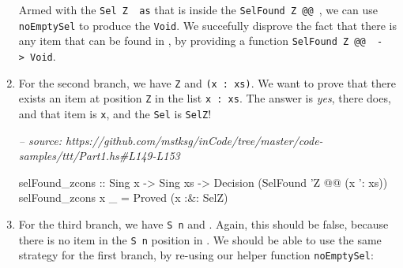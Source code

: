 \documentclass[]{article}
\newenvironment{Shaded}{}{}
\newcommand{\CommentTok}[1]{\textcolor[rgb]{0.38,0.63,0.69}{\textit{#1}}}
\newcommand{\DataTypeTok}[1]{\textcolor[rgb]{0.56,0.13,0.00}{#1}}
\newcommand{\FunctionTok}[1]{\textcolor[rgb]{0.02,0.16,0.49}{#1}}
\newcommand{\NormalTok}[1]{#1}
\newcommand{\OtherTok}[1]{\textcolor[rgb]{0.00,0.44,0.13}{#1}}
\begin{document}
\begin{enumerate}
\begin{Shaded}
\end{Shaded}

  Armed with the \texttt{Sel\ \textquotesingle{}Z\ \textquotesingle{}{[}{]}\ as}
  that is inside the
  \texttt{SelFound\ \textquotesingle{}Z\ @@\ \textquotesingle{}{[}{]}}, we can
  use \texttt{noEmptySel} to produce the \texttt{Void}. We succefully disprove
  the fact that there is any item that can be found in
  \texttt{\textquotesingle{}{[}{]}}, by providing a function
  \texttt{SelFound\ \textquotesingle{}Z\ @@\ \textquotesingle{}{[}{]}\ -\textgreater{}\ Void}.
\item
  For the second branch, we have \texttt{\textquotesingle{}Z} and
  \texttt{(x\ \textquotesingle{}:\ xs)}. We want to prove that there exists an
  item at position \texttt{\textquotesingle{}Z} in the list
  \texttt{x\ \textquotesingle{}:\ xs}. The answer is \emph{yes}, there does, and
  that item is \texttt{x}, and the \texttt{Sel} is \texttt{SelZ}!

\begin{Shaded}
\begin{Highlighting}[]
\CommentTok{-- source: https://github.com/mstksg/inCode/tree/master/code-samples/ttt/Part1.hs#L149-L153}

\NormalTok{selFound_zcons}
\OtherTok{    ::} \DataTypeTok{Sing}\NormalTok{ x}
    \OtherTok{->} \DataTypeTok{Sing}\NormalTok{ xs}
    \OtherTok{->} \DataTypeTok{Decision}\NormalTok{ (}\DataTypeTok{SelFound}\NormalTok{ '}\DataTypeTok{Z} \FunctionTok{@@}\NormalTok{ (x '}\FunctionTok{:}\NormalTok{ xs))}
\NormalTok{selFound_zcons x _ }\FunctionTok{=} \DataTypeTok{Proved}\NormalTok{ (x }\FunctionTok{:&:} \DataTypeTok{SelZ}\NormalTok{)}
\end{Highlighting}
\end{Shaded}
\item
  For the third branch, we have \texttt{\textquotesingle{}S\ n} and
  \texttt{\textquotesingle{}{[}{]}}. Again, this should be false, because there
  is no item in the \texttt{\textquotesingle{}S\ n} position in
  \texttt{\textquotesingle{}{[}{]}}. We should be able to use the same strategy
  for the first branch, by re-using our helper function \texttt{noEmptySel}:


\end{enumerate}
\end{document}
